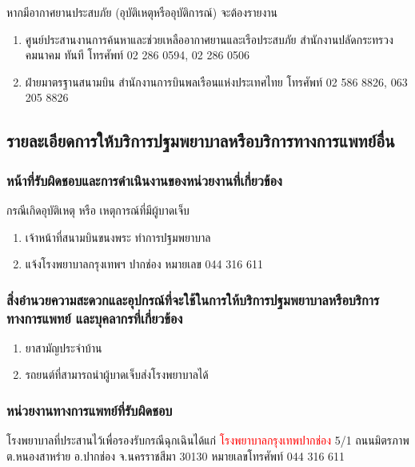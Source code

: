 หากมีอากาศยานประสบภัย (อุบัติเหตุหรืออุบัติการณ์) จะต้องรายงาน 

\begin{enumerate}
\item ศูนย์ประสานงานการค้นหาและช่วยเหลืออากาศยานและเรือประสบภัย สำนักงานปลัดกระทรวงคมนาคม ทันที โทรศัพท์ 02 286 0594, 02 286 0506
\item ฝ่ายมาตรฐานสนามบิน สำนักงานการบินพลเรือนแห่งประเทศไทย โทรศัพท์ 02 586 8826, 063 205 8826
\end{enumerate}

\subsection{รายละเอียดการให้บริการปฐมพยาบาลหรือบริการทางการแพทย์อื่น}

\subsubsection{หน้าที่รับผิดชอบและการดำเนินงานของหน่วยงานที่เกี่ยวข้อง}

กรณีเกิดอุบัติเหตุ หรือ เหตุการณ์ที่มีผู้บาดเจ็บ

\begin{enumerate}
\item เจ้าหน้าที่สนามบินขนงพระ ทำการปฐมพยาบาล 
\item แจ้งโรงพยาบาลกรุงเทพฯ ปากช่อง หมายเลข 044 316 611
\end{enumerate}

\subsubsection{สิ่งอำนวยความสะดวกและอุปกรณ์ที่จะใช้ในการให้บริการปฐมพยาบาลหรือบริการทางการแพทย์ และบุคลากรที่เกี่ยวข้อง}

\begin{enumerate}
\item ยาสามัญประจำบ้าน
\item รถยนต์ที่สามารถนำผู้บาดเจ็บส่งโรงพยาบาลได้ 
\end{enumerate}

\subsubsection{หน่วยงานทางการแพทย์ที่รับผิดชอบ}

โรงพยาบาลที่ประสานไว้เพื่อรองรับกรณีฉุกเฉินได้แก่ \textcolor{red}{โรงพยาบาลกรุงเทพปากช่อง} 5/1 ถนนมิตรภาพ ต.หนองสาหร่าย อ.ปากช่อง จ.นครราชสีมา  30130 หมายเลขโทรศัพท์ 044 316 611



